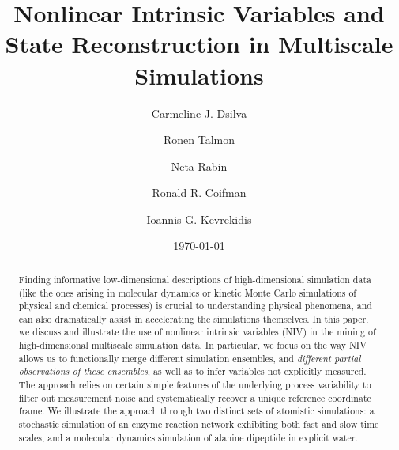 \documentclass[aip,jcp,preprint]{revtex4-1}
\begin{document}
\title{Nonlinear Intrinsic Variables and State Reconstruction in Multiscale Simulations}

\author{Carmeline J. Dsilva}

\author{Ronen Talmon}

\author{Neta Rabin}

\author{Ronald R. Coifman}

\author{Ioannis G. Kevrekidis}

\date{\today}

\begin{abstract}
Finding informative low-dimensional descriptions of high-dimensional simulation data
(like the ones arising in molecular dynamics or kinetic Monte Carlo simulations of
physical and chemical processes) is crucial to understanding physical phenomena, and can
also dramatically assist in accelerating the simulations themselves.
%
In this paper, we discuss and illustrate the use of nonlinear intrinsic variables (NIV)
in the mining of high-dimensional multiscale simulation data.
%
In particular, we focus on the way NIV allows us to functionally merge different
simulation ensembles, and {\em different partial observations of these ensembles}, as well
as to infer variables not explicitly measured.
%
The approach relies on certain simple features of the underlying process variability to
filter out measurement noise and systematically recover a unique reference coordinate frame.
%
We illustrate the approach through two distinct sets of atomistic simulations:
a stochastic simulation of an enzyme reaction network exhibiting both fast and slow time scales,
 and a molecular dynamics simulation of alanine dipeptide in explicit water.

\end{abstract}
\end{document}
